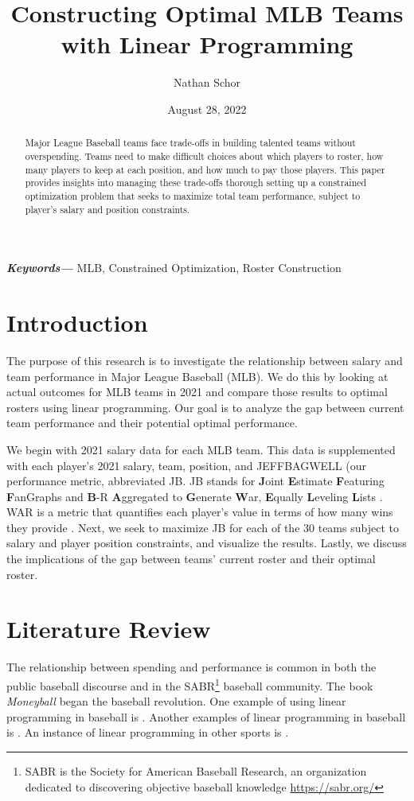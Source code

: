 \documentclass{article}
\title{Constructing Optimal MLB Teams with Linear Programming}
\author{Nathan Schor}
\date{August 28, 2022}
\begin{document}
\providecommand{\keywords}[1]
{
  \small	
  \textbf{\textit{Keywords---}} #1
}

\maketitle
\begin{abstract}
Major League Baseball teams face trade-offs in building talented teams without overspending. Teams need to make difficult choices about which players to roster, how many players to keep at each position, and how much to pay those players. This paper provides insights into managing these trade-offs thorough setting up a constrained optimization problem that seeks to maximize total team performance, subject to player's salary and position constraints. 
\end{abstract}
\keywords{MLB, Constrained Optimization, Roster Construction}
\newpage
\tableofcontents
\newpage
\section{Introduction}

The purpose of this research is to investigate the relationship between salary and team performance in Major League Baseball (MLB). We do this by looking at actual outcomes for MLB teams in 2021 and compare those results to optimal rosters using linear programming. Our goal is to analyze the gap between current team performance and their potential optimal performance. 

We begin with 2021 salary data for each MLB team. This data is supplemented with each player's 2021 salary, team, position, and JEFFBAGWELL (our performance metric, abbreviated JB. JB stands for \textbf{J}oint \textbf{E}stimate \textbf{F}eaturing \textbf{F}anGraphs and \textbf{B}-R \textbf{A}ggregated to \textbf{G}enerate \textbf{W}ar, \textbf{E}qually \textbf{L}eveling \textbf{L}ists \cite{JB}. WAR is a metric that quantifies each player's value in terms of how many wins they provide \cite{WAR}. Next, we seek to maximize JB for each of the 30 teams subject to salary and player position constraints, and visualize the results. Lastly, we discuss the implications of the gap between teams' current roster and their optimal roster.

\section{Literature Review}

The relationship between spending and performance is common in both the public baseball discourse and in the SABR\footnote{SABR is the Society for American Baseball Research, an organization dedicated to discovering objective baseball knowledge \url{https://sabr.org/}} baseball community. The book \emph{Moneyball} \cite{Moneyball} began the baseball revolution. One example of using linear programming in baseball is \cite{lp_R}. Another examples of linear programming in baseball is \cite{Adler99baseball}. An instance of linear programming in other sports is \cite{Aramouni2021}.
\end{document}
